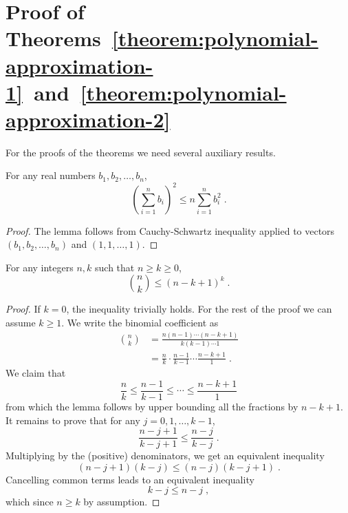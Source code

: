 \section{Proof of Theorems~\ref{theorem:polynomial-approximation-1}~and~\ref{theorem:polynomial-approximation-2}}
\label{section:proof-of-polynomial-approximation}

For the proofs of the theorems we need several auxiliary results.

\begin{lemma}
\label{lemma:simple-inequality}
For any real numbers $b_1, b_2, \dots, b_n$,
$$
\left( \sum_{i=1}^n b_i \right)^2 \le n \sum_{i=1}^n b_i^2 \; .
$$
\end{lemma}

\begin{proof}
The lemma follows from Cauchy-Schwartz inequality applied to
vectors $(b_1, b_2, \dots, b_n)$ and $(1,1,\dots,1)$.
\end{proof}

\begin{lemma}
\label{lemma:binomial-bound}
For any integers $n,k$ such that $n \ge k \ge 0$,
$$
\binom{n}{k} \le (n - k + 1)^k \; .
$$
\end{lemma}

\begin{proof}
If $k = 0$, the inequality trivially holds. For the rest of the proof we can
assume $k \ge 1$. We write the binomial coefficient as
\begin{align*}
\binom{n}{k}
& = \frac{n(n-1)\cdots(n-k+1)}{k(k-1) \cdots 1} \\
& = \frac{n}{k} \cdot \frac{n-1}{k - 1} \cdots \frac{n-k+1}{1} \; .
\end{align*}
We claim that
$$
\frac{n}{k} \le \frac{n-1}{k - 1} \le \cdots \le \frac{n-k+1}{1}
$$
from which the lemma follows by upper bounding all the fractions by $n-k+1$.
It remains to prove that for any $j=0,1,\dots,k-1$,
$$
\frac{n - j + 1}{k - j + 1} \le \frac{n - j}{k - j} \; .
$$
Multiplying by the (positive) denominators, we get an equivalent inequality
$$
(n - j + 1)(k - j) \le (n - j)(k - j + 1) \; .
$$
Cancelling common terms leads to an equivalent inequality
$$
k - j \le n - j \; ,
$$
which since $n \ge k$ by assumption.
\end{proof}

